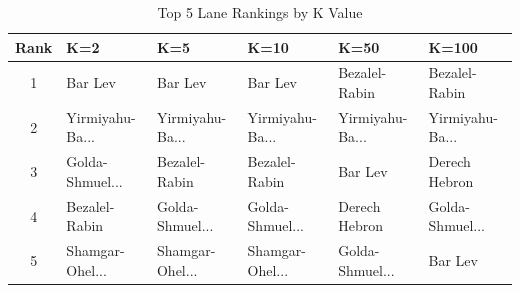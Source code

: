 \begin{table}[H]
\centering
\caption{Top 5 Lane Rankings by K Value}
\label{tab:sensitivity_k}
\begin{tabular}{@{}clllll@{}}
\toprule
\textbf{Rank} & \textbf{K=2} & \textbf{K=5} & \textbf{K=10} & \textbf{K=50} & \textbf{K=100} \\
\midrule
1 & Bar Lev & Bar Lev & Bar Lev & Bezalel-Rabin & Bezalel-Rabin \\
2 & Yirmiyahu-Ba... & Yirmiyahu-Ba... & Yirmiyahu-Ba... & Yirmiyahu-Ba... & Yirmiyahu-Ba... \\
3 & Golda-Shmuel... & Bezalel-Rabin & Bezalel-Rabin & Bar Lev & Derech Hebron \\
4 & Bezalel-Rabin & Golda-Shmuel... & Golda-Shmuel... & Derech Hebron & Golda-Shmuel... \\
5 & Shamgar-Ohel... & Shamgar-Ohel... & Shamgar-Ohel... & Golda-Shmuel... & Bar Lev \\
\bottomrule
\end{tabular}
\end{table}

